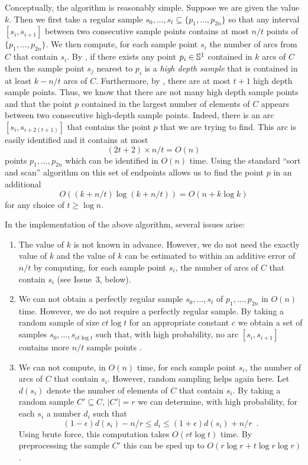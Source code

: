 \documentclass[charterfonts,lotsofwhite]{patmorin}
\begin{document}
Conceptually, the algorithm is reasonably simple.  Suppose we are given
the value $k$.  Then we first take a regular sample
$s_0,\ldots,s_t\subseteq \{p_1,\ldots,p_{2n}\}$ so that any interval
$[s_i,s_{i+1}]$ between two consecutive sample points contains at most
$n/t$ points of $\{p_1,\ldots,p_{2n}\}$.  We then compute, for each
sample point $s_i$ the number of arcs from $C$ that contain $s_i$.  By
, if there exists any point $p_i\in \mathbb{S}^1$ contained in
$k$ arcs of $C$ then the sample point $s_j$ nearest to $p_i$ is a
\emph{high depth sample} that is contained in at least $k-n/t$ arcs
of $C$.  Furthermore, by , there are at most
$t+1$
high depth sample points.  Thus, we know that there are not many high
depth sample points and that the point $p$ contained in the largest
number of elements of $C$ appears between two consecutive high-depth
sample points.  Indeed, there is an arc $[s_{i},s_{i+2(t+1)}]$ that
contains the point $p$ that we are trying to find.  This arc is easily
identified and it contains at most
\[
(2t+2) \times n/t = O(n)
\]
points $p_1,\ldots,p_{2n}$ which can be identified in $O(n)$ time.
Using the standard ``sort and scan'' algorithm on this set of
endpoints allows us to find the point $p$ in an additional 
\[
   O((k+n/t)\log (k+n/t)) = O(n+k\log k)
\]
for any choice of $t\ge \log n$.

In the implementation of the above algorithm, several issues
arise:

\begin{enumerate}
\item The value of $k$ is not known in advance.  However, we do not
need the exactly value of $k$ and the value of $k$ can be estimated to
within an additive error of $n/t$ by computing, for each sample point
$s_i$, the number of arcs of $C$ that contain $s_i$ (see Issue~3,
below).

\item We can not obtain a perfectly regular sample $s_0,\ldots,s_t$ of
$p_1,\ldots,p_{2n}$ in $O(n)$ time.  However, we do not require a
perfectly regular sample.  By taking a random sample of size $ct\log
t$ for an appropriate constant $c$ we obtain a set of samples
$s_0,\ldots,s_{ct\log t}$ such that, with high probability, no arc
$[s_{i},s_{i+1}]$ contains more $n/t$ sample points \cite{X}.

\item We can not compute, in $O(n)$ time, for each sample point $s_i$,
the number of arcs of $C$ that contain $s_i$.  However, random
sampling helps again here.  Let $d(s_i)$ denote the number of elements
of $C$ that contain $s_i$. By taking a random sample $C'\subseteq C$,
$|C'|=r$ we can determine, with high probability, for each $s_i$ a
number $d_i$ such that 
\[
        (1-\epsilon) d(s_i) - n/r\le d_i \le (1+\epsilon)d(s_i) + n/r \enspace .
\] 
Using brute force, this computation takes $O(rt\log t)$ time.  By
preprocessing the sample $C'$ this can be sped up to $O(r\log r+t\log
r\log r)$ \cite{X}.
\end{enumerate}
\end{document}
